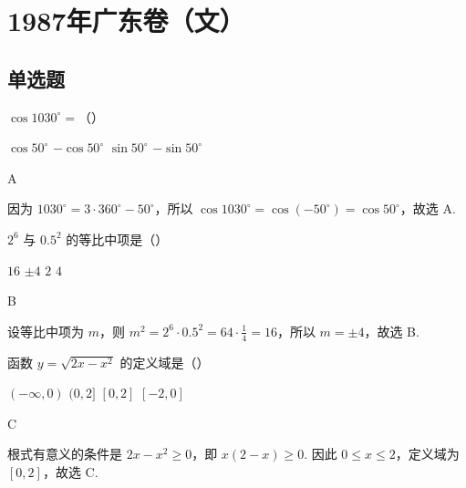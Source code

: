 \chapter{1987年广东卷（文）}

\section{单选题}

\begin{problem}
\(\cos1030^{\circ}=\)（\quad）

\choices
{\(\cos50^{\circ}\)}
{\(-\cos50^{\circ}\)}
{\(\sin50^{\circ}\)}
{\(-\sin50^{\circ}\)}
\end{problem}

\begin{answer}A\end{answer}

\begin{solution}
因为 \(1030^{\circ}=3\cdot360^{\circ}-50^{\circ}\)，所以 \(\cos1030^{\circ}=\cos(-50^{\circ})=\cos50^{\circ}\)，故选 A.
\end{solution}

\begin{problem}
\(2^{6}\) 与 \(0.5^{2}\) 的等比中项是（\quad）

\choices
{\(16\)}
{\(\pm4\)}
{\(2\)}
{\(4\)}
\end{problem}

\begin{answer}B\end{answer}

\begin{solution}
设等比中项为 \(m\)，则 \(m^{2}=2^{6}\cdot0.5^{2}=64\cdot\frac14=16\)，所以 \(m=\pm4\)，故选 B.
\end{solution}

\begin{problem}
函数 \(y=\sqrt{2x-x^{2}}\) 的定义域是（\quad）

\choices
{\((-\infty,0)\)}
{\((0,2]\)}
{\([0,2]\)}
{\([-2,0]\)}
\end{problem}

\begin{answer}C\end{answer}

\begin{solution}
根式有意义的条件是 \(2x-x^{2}\geqslant0\)，即 \(x(2-x)\geqslant0\). 因此 \(0\leqslant x\leqslant2\)，定义域为 \([0,2]\)，故选 C.
\end{solution}

